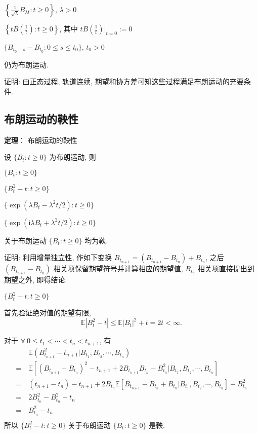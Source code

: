\documentclass[openany]{ctexbook}
\theoremstyle{kaiti}
\theoremstyle{normal}
\begin{document}
$\displaystyle\left\{\frac{1}{\sqrt{\lambda}}B_{\lambda t}:t\geqslant0\right\}$, $\lambda>0$

$\displaystyle\left\{tB\left(\frac{1}{t}\right):t\geqslant0\right\}$, 其中 $\displaystyle tB\left(\frac{1}{t}\right)\bigg|_{t=0}:=0$

$\{B_{t_0+s}-B_{t_0}:0\leqslant s\leqslant t_0\}$, $t_0>0$

仍为布朗运动.

证明: 由正态过程, 轨道连续, 期望和协方差可知这些过程满足布朗运动的充要条件.

\subsection{布朗运动的鞅性}

\textbf{定理}： 布朗运动的鞅性

设 $\{B_t:t\geqslant0\}$ 为布朗运动, 则

$\{B_t:t\geqslant0\}$

$\{B_t^2-t:t\geqslant0\}$

$\{\exp(\lambda B_t-\lambda^2t/2):t\geqslant0\}$

$\{\exp(\mathrm{i}\lambda B_t+\lambda^2t/2):t\geqslant0\}$

关于布朗运动 $\{B_t:t\geqslant0\}$ 均为鞅.

证明: 利用增量独立性, 作如下变换 $B_{t_{n+1}}=(B_{t_{n+1}}-B_{t_{n}})+B_{t_{n}}$, 之后 $(B_{t_{n+1}}-B_{t_{n}})$ 相关项保留期望符号并计算相应的期望值, $B_{t_{n}}$ 相关项直接提出到期望之外, 即得结论.

$\{B_t^2-t:t\geqslant0\}$

首先验证绝对值的期望有限,
\begin{equation}
  \mathbb{E}|B_t^2-t|\leqslant \mathbb{E}|B_t|^2+t= 2t<\infty.
\end{equation}

对于 $\forall~0\leqslant t_1<\cdots< t_n< t_{n+1}$, 有
\begin{equation}
  \begin{aligned}
    &~\mathbb{E}(B_{t_{n+1}}^2-t_{n+1}\big|B_{t_1},B_{t_2},\cdots,B_{t_n})\\
    =&~\mathbb{E}[(B_{t_{n+1}}-B_{t_n})^2-t_{n+1}+2B_{t_{n+1}}B_{t_n}-B_{t_n}^2\big|B_{t_1},B_{t_2},\cdots,B_{t_n}]\\
    =&~(t_{n+1}-t_n)-t_{n+1}+2B_{t_n}\mathbb{E}[B_{t_{n+1}}-B_{t_n}+B_{t_n}\big|B_{t_1},B_{t_2},\cdots,B_{t_n}]-B_{t_n}^2\\
    =&~2B_{t_n}^2-B_{t_n}^2-t_n\\
    =&~B_{t_n}^2-t_n\\
  \end{aligned}
\end{equation}
所以 $\{B_t^2-t:t\geqslant0\}$ 关于布朗运动 $\{B_t:t\geqslant0\}$ 是鞅.
\end{document}
